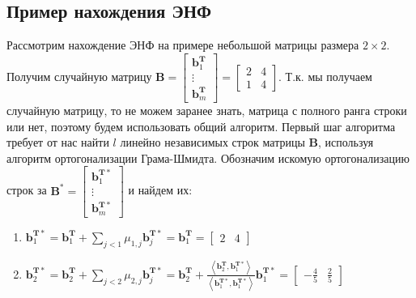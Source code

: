 \subsection{Пример нахождения ЭНФ}

Рассмотрим нахождение ЭНФ на примере небольшой матрицы размера $ 2 \times 2 $. Получим случайную матрицу $ \mathbf{B} =
\left[ \begin{array}{cccc}
\mathbf{b}^{\mathbf{T}}_1 \\
\vdots \\
\mathbf{b}^{\mathbf{T}}_m
\end{array} \right]
=
\left[ \begin{array}{cccc}
2 & 4 \\
1 & 4
\end{array} \right] $. Т.к. мы получаем случайную матрицу, то не можем заранее знать, матрица с полного ранга строки или нет, поэтому будем использовать общий алгоритм. Первый шаг алгоритма требует от нас найти $ l $ линейно независимых строк матрицы $ \mathbf{B} $, используя алгоритм ортогонализации Грама-Шмидта. Обозначим искомую ортогонализацию строк за $ \mathbf{B}^* = \left[ \begin{array}{cccc}
\mathbf{b}^{\mathbf{T}*}_1 \\
\vdots \\
\mathbf{b}^{\mathbf{T}*}_m
\end{array} \right] $ и найдем их:

\begin{enumerate}

\item $ \mathbf{b}^{\mathbf{T}*}_1 = \mathbf{b}^{\mathbf{T}}_1 + \sum\limits_{j < 1} \mu_{1, j}\mathbf{b}^{\mathbf{T}*}_j = \mathbf{b}^{\mathbf{T}}_1 = \left[ \begin{array}{cccc}
2 & 4
\end{array}
\right]$

\item $ \mathbf{b}^{\mathbf{T}*}_2 = \mathbf{b}^{\mathbf{T}}_2 + \sum\limits_{j < 2} \mu_{2, j}\mathbf{b}^{\mathbf{T}*}_j = \mathbf{b}^{\mathbf{T}}_2 + \frac{\left\langle \mathbf{b}^{\mathbf{T}}_2, \mathbf{b}^{\mathbf{T}*}_1 \right\rangle}{\left\langle \mathbf{b}^{\mathbf{T}*}_1, \mathbf{b}^{\mathbf{T}*}_1 \right\rangle} \mathbf{b}^{\mathbf{T}*}_1 = \left[ \begin{array}{cccc}
-\frac{4}{5} & \frac{2}{5}
\end{array}
\right]$

\end{enumerate}

